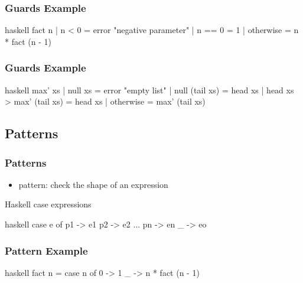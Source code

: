 \documentclass[dvipsnames]{beamer}
\theoremstyle{plain}
\begin{document}
\begin{frame}[fragile]
  \frametitle{Guards Example}

  \begin{example}[factorial]
    \begin{pygments}{haskell}
fact n
  | n < 0 = error "negative parameter"
  | n == 0 = 1
  | otherwise = n * fact (n - 1)
    \end{pygments}
  \end{example}
\end{frame}

\begin{frame}[fragile]
  \frametitle{Guards Example}

  \begin{example}
    \pause
    \begin{pygments}{haskell}
max' xs
  | null xs = error "empty list"
  | null (tail xs) = head xs
  | head xs > max' (tail xs) = head xs
  | otherwise = max' (tail xs)
    \end{pygments}
  \end{example}
\end{frame}

\subsection{Patterns}

\begin{frame}[fragile]
  \frametitle{Patterns}

  \begin{itemize}
    \item \alert{pattern}: check the shape of an expression
  \end{itemize}

  \begin{block}{Haskell case expressions}
    \begin{pygments}{haskell}
case e of
  p1 -> e1
  p2 -> e2
  ...
  pn -> en
  _ -> eo
    \end{pygments}
  \end{block}
\end{frame}

\begin{frame}[fragile]
  \frametitle{Pattern Example}

  \begin{example}[factorial]
    \begin{pygments}{haskell}
fact n =
    case n of
      0 -> 1
      _ -> n * fact (n - 1)
    \end{pygments}
  \end{example}
\end{frame}
\end{document}
